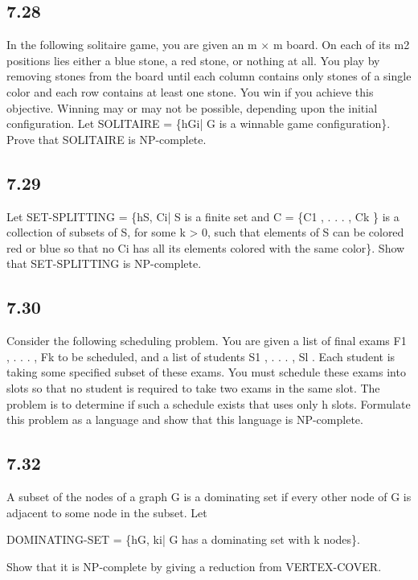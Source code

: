 \subsection*{7.28}

In the following solitaire game, you are given an m $\times$ m board. On each of its m2 positions lies either a blue stone, a red stone, or nothing at all. You play by removing stones from the board until each column contains only stones of a single color and each row contains at least one stone. You win if you achieve this objective. Winning may or may not be possible, depending upon the initial configuration. Let SOLITAIRE = \{hGi| G is a winnable game configuration\}. Prove that SOLITAIRE is NP-complete.


\subsection*{7.29}

Let SET-SPLITTING = \{hS, Ci| S is a finite set and C = \{C1 , . . . , Ck \} is a collection of subsets of S, for some k > 0, such that elements of S can be colored red or blue so that no Ci has all its elements colored with the same color\}. Show that SET-SPLITTING is NP-complete.


\subsection*{7.30}

Consider the following scheduling problem. You are given a list of final exams F1 , . . . , Fk to be scheduled, and a list of students S1 , . . . , Sl . Each student is taking some specified subset of these exams. You must schedule these exams into slots so that no student is required to take two exams in the same slot. The problem is to determine if such a schedule exists that uses only h slots. Formulate this problem as a language and show that this language is NP-complete.


\subsection*{7.32}

A subset of the nodes of a graph G is a dominating set if every other node of G is adjacent to some node in the subset. Let

DOMINATING-SET = \{hG, ki| G has a dominating set with k nodes\}.

Show that it is NP-complete by giving a reduction from VERTEX-COVER.


